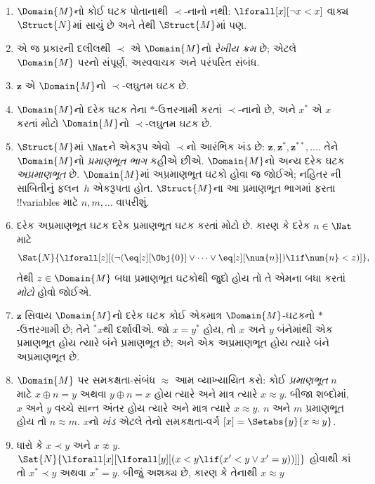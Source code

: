 \documentclass[../../../include/open-logic-section]{subfiles}
\begin{document}
\begin{enumerate}
\item $\Domain{M}$નો કોઈ ઘટક
  પોતાનાથી $\prec$-નાનો નથી:
  $\lforall[x][\lnot x < x]$
  વાક્ય $\Struct{N}$માં સાચું
  છે અને તેથી $\Struct{M}$માં પણ.
\item એ જ પ્રકારની દલીલથી
  $\prec$ એ $\Domain{M}$નો
  \emph{રેખીય ક્રમ} છે; એટલે
  $\Domain{M}$ પરનો સંપૂર્ણ,
  અસ્વવાચક અને પરંપરિત સંબંધ.
\item $\mathbf{z}$ એ
  $\Domain{M}$નો $\prec$-લઘુતમ
  ઘટક છે.
\item $\Domain{M}$નો દરેક
  ઘટક તેના $*$-ઉત્તરગામી
  કરતાં $\prec$-નાનો છે,
  અને $x^*$ એ $x$ કરતાં
  મોટો $\Domain{M}$નો
  $\prec$-લઘુતમ ઘટક છે.
\item $\Struct{M}$માં
  $\Nat$ને એકરૂપ એવો
  $\prec$નો આરંભિક ખંડ છે:
  $\mathbf{z}, \mathbf{z}^*, \mathbf{z}^{**}, \dots$.
  તેને $\Domain{M}$નો
  \emph{પ્રમાણભૂત ભાગ}
  કહીએ છીએ. $\Domain{M}$નો
  અન્ય દરેક ઘટક
  \emph{અપ્રમાણભૂત} છે.
  $\Domain{M}$માં અપ્રમાણભૂત
  ઘટકો હોવા જ
  જોઈએ; નહિતર
  ની
  સાબિતીનું ફલન~$h$
  એકરૂપતા હોત.
  $\Struct{M}$ના આ પ્રમાણભૂત
  ભાગમાં ફરતા !!{variable}s
  માટે $n, m, \dots$
  વાપરીશું.
\item દરેક અપ્રમાણભૂત
  ઘટક દરેક પ્રમાણભૂત
  ઘટક કરતાં મોટો છે.
  કારણ કે દરેક
  $n \in \Nat$ માટે
  \[
  \Sat{N}{\lforall[z][(\lnot(\eq[z][\Obj{0}] \lor
  \dots \lor \eq[z][\num{n}]) \lif \num{n} < z)]},
  \]
  તેથી $z \in \Domain{M}$
  બધા પ્રમાણભૂત ઘટકોથી
  જુદો હોય તો તે
  એમના બધા કરતાં
  \emph{મોટો} હોવો જોઈએ.
\item $\mathbf{z}$ સિવાય
  $\Domain{M}$નો દરેક
  ઘટક કોઈ એકમાત્ર
  $\Domain{M}$-ઘટકનો
  $*$-ઉત્તરગામી છે;
  તેને $^*x$થી દર્શાવીએ.
  જો $x = y^*$ હોય,
  તો $x$ અને $y$
  બંનેમાંથી એક
  પ્રમાણભૂત હોય ત્યારે
  બંને પ્રમાણભૂત છે;
  અને એક અપ્રમાણભૂત
  હોય ત્યારે બંને
  અપ્રમાણભૂત છે.
\item $\Domain{M}$ પર
  સમકક્ષતા-સંબંધ
  $\approx$ આમ
  વ્યાખ્યાયિત કરો:
  કોઈ \emph{પ્રમાણભૂત}
  $n$ માટે $x \oplus n = y$
  અથવા $y \oplus n =x$
  હોય ત્યારે અને માત્ર
  ત્યારે $x \approx y$.
  બીજા શબ્દોમાં,
  $x$ અને $y$ વચ્ચે
  સાન્ત અંતર હોય
  ત્યારે અને માત્ર
  ત્યારે $x \approx y$.
  $n$ અને $m$
  પ્રમાણભૂત હોય તો
  $n \approx m$.
  $x$નો \emph{ખંડ}
  એટલે તેનો સમકક્ષતા-વર્ગ
  $[x] = \Setabs{y}{x
  \approx y}$.
\item ધારો કે $x \prec y$
  અને $x \not\approx y$.
  $\Sat{N}{\lforall[x][\lforall[y][(x < y \lif (x' < y \lor x' =
      y))]]}$ હોવાથી કાં તો
  $x^* \prec y$ અથવા
  $x^* = y$. બીજું
  અશક્ય છે, કારણ કે
  તેનાથી $x \approx y$

\end{enumerate}
\end{document}
